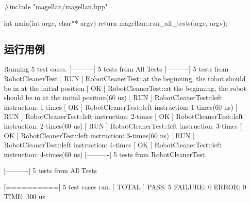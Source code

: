 \begin{content}
\begin{leftbar}
\begin{c++}[caption={test/main.cpp}]
#include "magellan/magellan.hpp"

int main(int argc, char** argv)
{
    return magellan::run_all_tests(argc, argv);
}
\end{c++}
\end{leftbar}

\subsection{运行用例}

\begin{leftbar}
\begin{ruby}[caption={运行结果}]
[==========] Running 5 test cases.
[----------] 5 tests from All Tests
[----------] 5 tests from RobotCleanerTest
[ RUN      ] RobotCleanerTest::at the beginning, the robot should be in at the initial position
[       OK ] RobotCleanerTest::at the beginning, the robot should be in at the initial position(60 us)
[ RUN      ] RobotCleanerTest::left instruction: 1-times
[       OK ] RobotCleanerTest::left instruction: 1-times(60 us)
[ RUN      ] RobotCleanerTest::left instruction: 2-times
[       OK ] RobotCleanerTest::left instruction: 2-times(60 us)
[ RUN      ] RobotCleanerTest::left instruction: 3-times
[       OK ] RobotCleanerTest::left instruction: 3-times(60 us)
[ RUN      ] RobotCleanerTest::left instruction: 4-times
[       OK ] RobotCleanerTest::left instruction: 4-times(60 us)
[----------] 5 tests from RobotCleanerTest

[----------] 5 tests from All Tests

[==========] 5 test cases ran.
[  TOTAL   ] PASS: 5  FAILURE: 0  ERROR: 0  TIME: 300 us
\end{ruby}
\end{leftbar}

\end{content}
